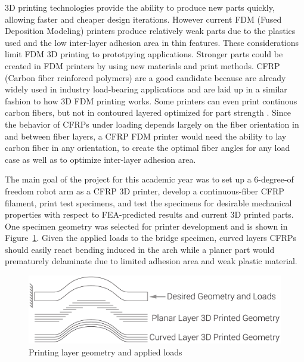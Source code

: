 
3D printing technologies provide the ability to produce new parts quickly, allowing faster and cheaper design iterations. However current FDM (Fused Deposition Modeling) printers produce relatively weak parts due to the plastics used and the low inter-layer adhesion area in thin features. These considerations limit FDM 3D printing to prototpying applications. Stronger parts could be created in FDM printers by using new materials and print methods. CFRP (Carbon fiber reinforced polymers) are a good candidate because are already widely used in industry load-bearing applications and are laid up in a similar fashion to how 3D FDM printing works. Some printers can even print continous carbon fibers, but not in contoured layered optimized for part strength \cite{markforged}. Since the behavior of CFRPs under loading depends largely on the fiber orientation in and between fiber layers, a CFRP FDM printer would need the ability to lay carbon fiber in any orientation, to create the optimal fiber angles for any load case as well as to optimize inter-layer adhesion area. 

The main goal of the project for this academic year was to set up a 6-degree-of freedom robot arm as a CFRP 3D printer, develop a continuous-fiber CFRP filament, print test specimens, and test the specimens for desirable mechanical properties with respect to FEA-predicted results and current 3D printed parts. One specimen geometry was selected for printer development and is shown in Figure~\ref{fig:intro-layers-geometry-loads}. Given the applied loads to the bridge specimen, curved layers CFRPs should easily react bending induced in the arch while a planer part would prematurely delaminate due to limited adhesion area and weak plastic material. 

\begin{figure}[t]
\centering
\includegraphics[width=0.8\linewidth]{./figures/intro-layers-geometry-loads}
\caption{Printing layer geometry and applied loads}
\label{fig:intro-layers-geometry-loads}
\end{figure}